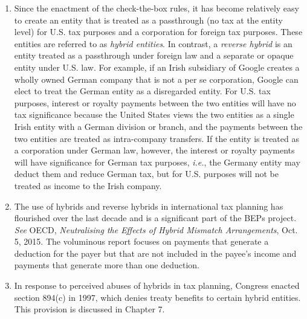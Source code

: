 	\begin{enumerate}

	\item Since the enactment of the check-the-box rules, it has become relatively easy to create an entity that is treated as a passthrough (no tax at the entity level) for U.S. tax purposes and a corporation for foreign tax purposes.  These entities are referred to as \emph{hybrid entities}. In contrast, a \emph{reverse hybrid} is an entity treated as a passthrough under foreign law and a separate or opaque entity under U.S. law. For example, if an Irish  subsidiary of Google creates a wholly owned German company that is not a per se corporation, Google can elect to treat the German entity as a disregarded entity.  For U.S. tax purposes, interest or royalty payments between the two entities will have no tax significance because the United States views the two entities as a single Irish entity with a German division or branch, and the payments between the two entities are treated as intra-company transfers.  If the entity is treated as a corporation under German law, however, the interest or royalty payments will have significance for German tax purposes, \emph{i.e.}, the Germany entity may deduct them and reduce German tax, but for U.S. purposes will not be treated as income to the Irish company.  
	
	\item The use of hybrids and reverse hybrids in international tax planning has flourished over the last decade and is a significant part of the BEPs project.  \textit{See} OECD, \textit{Neutralising the Effects of Hybrid Mismatch Arrangements}, Oct. 5, 2015.  The voluminous report focuses on payments that generate a deduction for the payer but that are not included in the payee's income and payments that generate more than one deduction.   
	
	
	\item In response to perceived abuses of hybrids in tax planning, Congress enacted section 894(c) in 1997, which denies treaty benefits to certain hybrid entities.  This provision is discussed in Chapter 7.
	
			
	

\end{enumerate}
